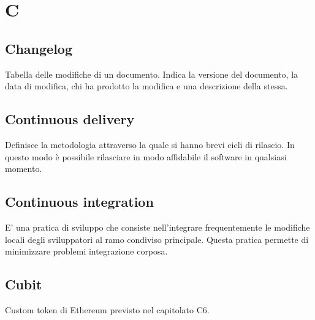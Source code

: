 \section*{C}
\subsection*{Changelog
 }
Tabella delle modifiche di un documento. Indica la versione del documento, la data di modifica, chi ha prodotto la modifica e una descrizione della stessa.

\subsection*{Continuous delivery}
Definisce la metodologia attraverso la quale si hanno brevi cicli di rilascio. In questo modo è possibile rilasciare in modo affidabile il software in qualsiasi momento.

\subsection*{Continuous integration
}
E’ una pratica di sviluppo che consiste nell’integrare frequentemente le modifiche locali degli sviluppatori al ramo condiviso principale. Questa pratica permette di minimizzare problemi integrazione corposa.

\subsection*{Cubit
}
Custom token di Ethereum previsto nel capitolato C6.











